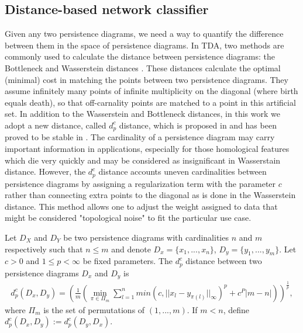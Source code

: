 \documentclass[10pt]{article}
\newenvironment{definition}[2][Definition]{\begin{trivlist}
\item[\hskip \labelsep {\bfseries #1}\hskip \labelsep {\bfseries #2.}]}{\end{trivlist}}
\begin{document}
\subsection{Distance-based network classifier}
Given any two persistence diagrams, we need a way to quantify the difference between them in the space of persistence diagrams. In TDA, two methods are commonly used to calculate the distance between persistence diagrams: the Bottleneck and Wasserstein distances \cite{adams2017persistence,bubenik2015statistical,edelsbrunner2010computational,kerber2017geometry,wasserman2018topological}. These distances calculate the optimal (minimal) cost in matching the points between two persistence diagrams. They assume infinitely many points of infinite multiplicity on the diagonal (where birth equals death), so that off-carnality points are matched to a point in this artificial set. In addition to the Wasserstein and Bottleneck distances, in this work we adopt a new distance, called $d^c_p$ distance, which is proposed in \cite{marchese2018signal} and has been proved to be stable in \cite{maroulas2018stable}. The cardinality of a persistence diagram may carry important information in applications, especially for those homological features which die very quickly and may be considered as insignificant in Wasserstain distance. However, the $d^c_p$ distance accounts uneven cardinalities between persistence diagrams by assigning a regularization term with the parameter $c$ rather than connecting extra points to the diagonal as is done in the Wasserstein distance. This method allows one to adjust the weight assigned to data that might be considered "topological noise" to fit the particular use case.

\begin{definition}{1}
Let $D_X$ and $D_Y$ be two persistence diagrams with cardinalities $n$ and $m$ respectively such that $n \leq m$ and denote $D_x=\{ x_1,...,x_n \}$, $D_y=\{ y_1,...,y_m \}$. Let $c>0$ and $1\leq p <\infty$ be fixed parameters. The $d^c_p$ distance between two persistence diagrams $D_x$ and $D_y$ is
\begin{align}
    d^c_p(D_x,D_y)= \left( \frac{1}{m} \left( \min_{\pi \in \Pi_m} \sum^n_{l=1} min(c,||x_l-y_{\pi(l)}||_\infty)^p+c^P|m-n|  \right) \right)^{\frac{1}{p}},
    \label{eq:dpcdistance}
\end{align}
where $\Pi_m$ is the set of permutations of $(1,...,m)$. If $m<n$, define $d^c_p(D_x,D_y):=d^c_p(D_y,D_x)$.
\end{definition}
\end{document}
